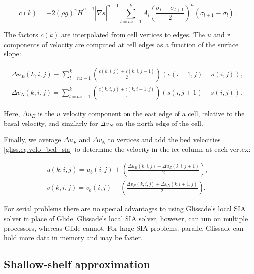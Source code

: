 {\begin{equation}
  \label{gliss.eq.vert_factor_sia_discrete}
  c(k) = -2(\rho g)^n \bar{H}^{n+1} |\vec\nabla s|^{n-1} 
  \sum\limits_{l=nz-1}^{k} {{{{\bar{A}}}_{l}}}{{\left( \frac{{{\sigma }_{l}}+{{\sigma }_{l+1}}}{2} \right)}^{n}}\left( 
               {{\sigma }_{l+1}}-{{\sigma }_{l}} \right).
\end{equation}

\noindent
The factors $c(k)$ are interpolated from cell vertices to edges.  The $u$ and $v$ 
components of velocity are computed at cell edges as a function of the surface slope: 

\begin{equation}
  \label{gliss.eq.velo_interior_sia}
  \begin{split}
    {\Delta {u}_{E}}(k,i,j) = \sum\limits_{l=nz-1}^{k}{\left( \frac{c(k,i,j)+c(k,i,j-1)}{2} \right)\left( s(i+1,j)-s(i,j) \right)}, \\
    {\Delta {v}_{N}}(k,i,j) = \sum\limits_{l=nz-1}^{k}{\left( \frac{c(k,i,j)+c(k,i-1,j)}{2} \right)\left( s(i,j+1)-s(i,j) \right)}.
  \end{split}
\end{equation}

\noindent
Here, $\Delta{u_E}$ is the $u$ velocity component on the east edge of a cell, relative to the basal velocity,
and similarly for $\Delta{v_N}$ on the north edge of the cell.

Finally, we average $\Delta u_E$ and $\Delta v_N$ to vertices and add the bed velocities 
\eqref{gliss.eq.velo_bed_sia} to determine the velocity in the ice column at each vertex:

\begin{equation}
  \label{gliss.eq.velo_sia}
  \begin{split}
    u(k,i,j) = u_b(i,j) + \left( \frac{\Delta {{u}_{E}}(k,i,j) + \Delta {{u}_{E}}(k,i,j+1)}{2} \right), \\
    v(k,i,j) = v_b(i,j) + \left( \frac{\Delta {{v}_{N}}(k,i,j) + \Delta {{v}_{N}}(k,i+1,j)}{2} \right).
  \end{split}
\end{equation}

For serial problems there are no special advantages to using Glissade's local SIA solver 
in place of Glide.  Glissade's local SIA solver, however, can run on multiple processors, 
whereas Glide cannot.  For large SIA problems, parallel Glissade can hold more data
in memory and may be faster.

\subsection{Shallow-shelf approximation}

}
